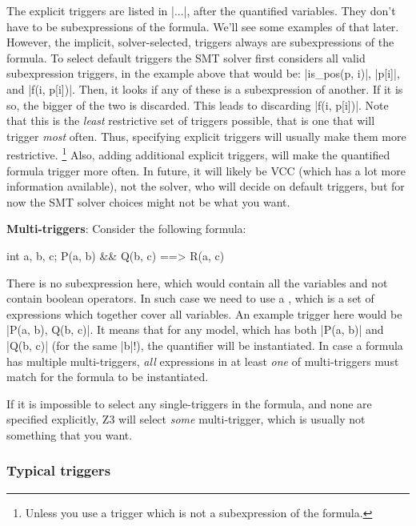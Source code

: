 The explicit triggers are listed in \vcc|{...}|, after the quantified variables.
They don't have to be subexpressions of the formula. 
We'll see some examples of that later. 
However, the implicit, solver-selected, triggers always are subexpressions of the formula.
To select default triggers the SMT solver first considers all valid subexpression triggers,
in the example above that would be:
\vcc|is_pos(p, i)|, \vcc|p[i]|, and \vcc|f(i, p[i])|.
Then, it looks if any of these is a subexpression of another.
If it is so, the bigger of the two is discarded.
This leads to discarding \vcc|f(i, p[i])|.
Note that this is the \emph{least} restrictive set of
triggers possible, that is one that will trigger \emph{most} often.
Thus, specifying explicit triggers will usually make them more restrictive.%
\footnote{ Unless you use a trigger which is not a subexpression of the formula. }
Also, adding additional explicit triggers, will make the quantified formula trigger more often.
In future, it will likely be VCC (which has a lot more information available),
not the solver, who will decide on default triggers, but for now the SMT solver
choices might not be what you want.

\begin{note}
\textbf{Multi-triggers}:
Consider the following formula:
\begin{VCC}
\forall int a, b, c; P(a, b) && Q(b, c) ==> R(a, c)
\end{VCC}
There is no subexpression here, which would contain all the variables
and not contain boolean operators.
In such case we need to use a , which
is a set of expressions which together cover all variables.
An example trigger here would be \vcc|{P(a, b), Q(b, c)}|.
It means that for any model, which has both \vcc|P(a, b)|
and \vcc|Q(b, c)| (for the same \vcc|b|!), the quantifier
will be instantiated.
In case a formula has multiple multi-triggers, \emph{all}
expressions in at least \emph{one} of multi-triggers
must match for the formula to be instantiated.

If it is impossible to select any single-triggers in the formula,
and none are specified explicitly, Z3 will select \emph{some}
multi-trigger, which is usually not something that you want.
\end{note}


\subsubsection{Typical triggers}


